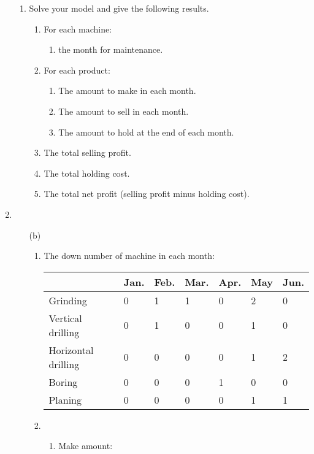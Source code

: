 \documentclass[12pt,a4paper]{article}
\makeatletter
\newtheorem*{solution}{Solution}
\theoremstyle{definition}
\renewenvironment{solution}[1][Solution] {\par\pushQED{\qed}\normalfont\topsep6\p@\@plus6\p@\relax\trivlist\item[\hskip\labelsep\bfseries#1\@addpunct{.}]\ignorespaces}{\popQED\endtrivlist\@endpefalse} \makeatother
\makeatother
\begin{document}
\begin{enumerate}
\begin{enumerate}
		\item
		Solve your model and give the following results.
		\begin{enumerate}
			\item
			For each machine:
			\begin{enumerate}
				\item
				the month for maintenance.
			\end{enumerate}
			\item
			For each product:
			\begin{enumerate}
				\item
				The amount to make in each month.
				\item
				The amount to sell in each month.
				\item
				The amount to hold at the end of each month.
			\end{enumerate}
			\item
			The total selling profit.
			\item
			The total holding cost.
			\item
			The total net profit (selling profit minus holding cost).
		\end{enumerate}
	\end{enumerate}
	\begin{solution}
		\begin{enumerate}
			\item[(b)]
			\begin{enumerate}
				\item The down number of machine in each month:
				\begin{table}[htbp]
					\scriptsize
					\centering
					\renewcommand\arraystretch{1.1}
					\begin{tabular}{m{} m{0.07\textwidth}<{\centering} m{}<{\centering} m{}<{\centering} m{}<{\centering} m{}<{\centering} m{}<{\centering}}
						\hline
						& Jan. & Feb. & Mar. & Apr. & May & Jun. \\\hline
						Grinding & 0 & 1 & 1 & 0 & 2 & 0 \\
						Vertical drilling & 0 & 1 & 0 & 0 & 1 & 0 \\
						Horizontal drilling & 0 & 0 & 0 & 0 & 1 & 2 \\
						Boring & 0 & 0 & 0 & 1 & 0 & 0 \\
						Planing & 0 & 0 & 0 & 0 & 1 & 1 \\
						\hline
					\end{tabular}
				\end{table}
				\item 
				\begin{enumerate}
					\item Make amount:
					

\end{enumerate}
\end{enumerate}
\end{enumerate}
\end{solution}
\end{enumerate}
\end{document}
